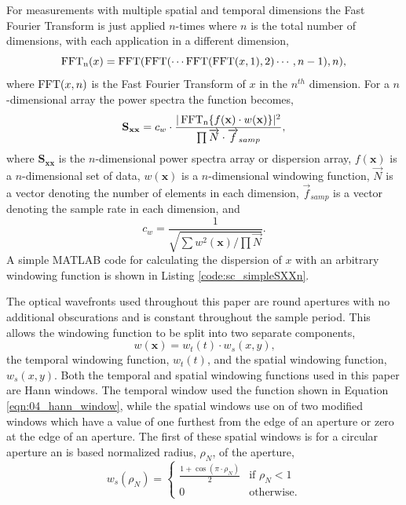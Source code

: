 For measurements with multiple spatial and temporal dimensions the Fast Fourier Transform is just applied $n$-times where $n$ is the total number of dimensions, with each application in a different dimension,
\begin{equation}
 \operatorname{FFT_n}(x) = \operatorname{FFT}(\operatorname{FFT}(\cdots\operatorname{FFT}(\operatorname{FFT}(x,1),2)\cdots,n-1),n) \textrm{,}
 \label{eqn:04_fftn}
\end{equation}
where $\operatorname{FFT}(x,n)$ is the Fast Fourier Transform of $x$ in the $n^{th}$ dimension.
For a $n$-dimensional array the power spectra the function becomes,
\begin{equation}
 \mathbf{S_{xx}} = c_w\cdot\frac{|\operatorname{FFT_n}\{f(\mathbf{x})\cdot w(\mathbf{x})\}|^2}{\prod{\overrightarrow{N}\cdot \overrightarrow{f}_{samp}}} \textrm{,}
 \label{eqn:04_sxxn}
\end{equation}
where $\mathbf{S_{xx}}$ is the $n$-dimensional power spectra array or dispersion array, $f(\mathbf{x})$ is a $n$-dimensional set of data, $w(\mathbf{x})$ is a $n$-dimensional windowing function, $\overrightarrow{N}$ is a vector denoting the number of elements in each dimension, $\overrightarrow{f}_{samp}$ is a vector denoting the sample rate in each dimension, and
\begin{equation}
 c_w = \frac{1}{\sqrt{\sum w^2(\mathbf{x})/\prod{\overrightarrow{N}}}} \textrm{.}
 \label{eqn:04_windown}
\end{equation}
A simple MATLAB code for calculating the dispersion of $x$ with an arbitrary windowing function is shown in Listing \ref{code:sc_simpleSXXn}.

The optical wavefronts used throughout this paper are round apertures with no additional obscurations and is constant throughout the sample period.
This allows the windowing function to be split into two separate components,
\begin{equation}
 w(\mathbf{x}) = w_t(t)\cdot w_s(x,y) \textrm{,}
 \label{eqn:04_window_sep}
\end{equation}
the temporal windowing function, $w_t(t)$, and the spatial windowing function, $w_s(x,y)$.
Both the temporal and spatial windowing functions used in this paper are Hann windows.
The temporal window used the function shown in Equation \ref{eqn:04_hann_window}, while the spatial windows use on of two modified windows which have a value of one furthest from the edge of an aperture or zero at the edge of an aperture.
The first of these spatial windows is for a circular aperture an is based normalized radius, $\rho_N$, of the aperture,
\begin{equation}
 w_s(\rho_N) =
 \begin{cases}
  \frac{1+\cos(\pi\cdot\rho_N)}{2} & \textrm{if } \rho_N < 1 \\
  0                                & \textrm{otherwise.}
 \end{cases}
 \label{eqn:04_window_space}
\end{equation}

